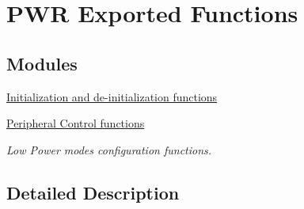 \hypertarget{group___p_w_r___exported___functions}{}\section{P\+WR Exported Functions}
\label{group___p_w_r___exported___functions}
\subsection*{Modules}
\begin{DoxyCompactItemize}
\item 
\hyperlink{group___p_w_r___exported___functions___group1}{Initialization and de-\/initialization functions}
\item 
\hyperlink{group___p_w_r___exported___functions___group2}{Peripheral Control functions}
\begin{DoxyCompactList}\small\item\em Low Power modes configuration functions. \end{DoxyCompactList}\end{DoxyCompactItemize}


\subsection{Detailed Description}
